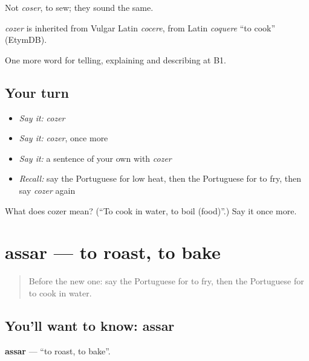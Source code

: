 Not \emph{coser}, to sew; they sound the same.

\begin{cousinweb}
\emph{cozer} is inherited from Vulgar Latin \emph{cocere}, from Latin \emph{coquere} \textquotedblleft{}to cook\textquotedblright{} (EtymDB).
\end{cousinweb}

\begin{grammarlens}[title={What you've built}]
One more word for telling, explaining and describing at B1.
\end{grammarlens}

\subsection*{Your turn}
\begin{itemize}
\raggedright
  \item \emph{Say it:} \emph{cozer}
  \item \emph{Say it:} \emph{cozer}, once more
  \item \emph{Say it:} a sentence of your own with \emph{cozer}
  \item \emph{Recall:} say the Portuguese for low heat, then the Portuguese for to fry, then say \emph{cozer} again
\end{itemize}

\begin{tcolorbox}[breakable,colback=teal!4,colframe=teal!35!black,title={Before you move on}]
What does cozer mean? (\textquotedblleft{}To cook in water, to boil (food)\textquotedblright{}.) Say it once more.
\end{tcolorbox}
\section[assar]{assar — to roast, to bake}

\label{lesson:PT-C332-assar}



\begin{quote}
Before the new one: say the Portuguese for to fry, then the Portuguese for to cook in water.
\end{quote}

\subsection*{You'll want to know: assar}
\textbf{assar} — \textquotedblleft{}to roast, to bake\textquotedblright{}.

